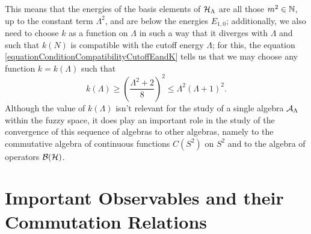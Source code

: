 This means that the energies of the basis elements of $\mathcal H_\Lambda$ are all those $m^2 \in \mathbb{N}$, up to the constant term $\Lambda^2$, and are below the energies $E_{1,0}$; additionally, we also need to choose $k$ as a function on $\Lambda$ in such a way that it diverges with $\Lambda$ and such that $k(N)$ is compatible with the cutoff energy $\Lambda$; for this, the equation \eqref{equationConditionCompatibilityCutoffEandK} tells us that we may choose any function $k = k(\Lambda)$ such that
\begin{equation}\label{inequationInequalityNeededforKasFunctionLambdaD2}
    k(\Lambda) \geq  \left( \frac{\Lambda^2 + 2}{8} \right)^2\leq \Lambda^2 (\Lambda + 1)^2.
\end{equation}
Although the value of $k(\Lambda)$ isn't relevant for the study of a single algebra $\mathcal A_\Lambda$ within the fuzzy space, it does play an important role in the study of the convergence of this sequence of algebras to other algebras, namely to the commutative algebra of continuous functions $C(S^2)$ on $S^2$ and to the algebra of operators $\mathcal B(\mathcal H)$.


\section{Important Observables and their Commutation Relations}

    
     
